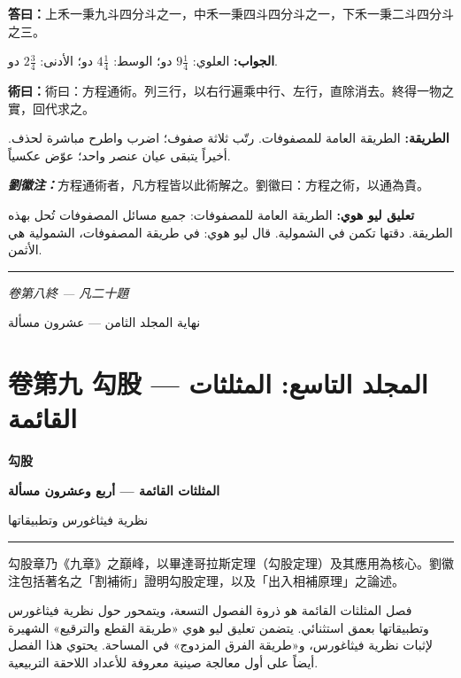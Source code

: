 \documentclass[11pt,a4paper]{article}
\newcommand{\ar}[1]{\arabicfont\beginR #1\endR}
\newcommand{\longline}{\noindent\rule{\textwidth}{0.4pt}}
\newcommand{\ChinCol}[1]{\begin{minipage}[t]{0.48\textwidth}#1\end{minipage}}
\newcommand{\ArabCol}[1]{\begin{minipage}[t]{0.48\textwidth}\arabicfont\beginR #1\endR\end{minipage}}
\newcommand{\parallelsection}[2]{%
  \noindent\ChinCol{#1}\hfill\ArabCol{#2}\par\vspace{0.5cm}%
}
\newcounter{probnum}
\newcommand{\answer}[2]{\par\noindent%
  \begin{minipage}[t]{0.48\textwidth}\textbf{答曰：}#1\end{minipage}%
  \hfill%
  \begin{minipage}[t]{0.48\textwidth}\arabicfont\beginR\textbf{الجواب:} #2\endR\end{minipage}\par\vspace{0.2cm}}
\newcommand{\method}[2]{\par\noindent%
  \begin{minipage}[t]{0.48\textwidth}\textbf{術曰：}#1\end{minipage}%
  \hfill%
  \begin{minipage}[t]{0.48\textwidth}\arabicfont\beginR\textbf{الطريقة:} #2\endR\end{minipage}\par\vspace{0.3cm}}
\newcommand{\commentary}[2]{\par\noindent%
  \begin{minipage}[t]{0.48\textwidth}\textcolor{commentarycolor}{\textit{\textbf{劉徽注：}}#1}\end{minipage}%
  \hfill%
  \begin{minipage}[t]{0.48\textwidth}\arabicfont\beginR\textcolor{commentarycolor}{\textbf{تعليق ليو هوي:} #2}\endR\end{minipage}\par\vspace{0.2cm}}
\begin{document}
\answer{上禾一秉九斗四分斗之一，中禾一秉四斗四分斗之一，下禾一秉二斗四分斗之三。}{العلوي: $9\frac{1}{4}$ دو؛ الوسط: $4\frac{1}{4}$ دو؛ الأدنى: $2\frac{3}{4}$ دو.}

\method{術曰：方程通術。列三行，以右行遍乘中行、左行，直除消去。終得一物之實，回代求之。}{الطريقة العامة للمصفوفات. رتّب ثلاثة صفوف؛ اضرب واطرح مباشرة لحذف. أخيراً يتبقى عيان عنصر واحد؛ عوّض عكسياً.}

\commentary{方程通術者，凡方程皆以此術解之。劉徽曰：方程之術，以通為貴。}{الطريقة العامة للمصفوفات: جميع مسائل المصفوفات تُحل بهذه الطريقة. دقتها تكمن في الشمولية. قال ليو هوي: في طريقة المصفوفات، الشمولية هي الأثمن.}

\vspace{0.5cm}
\longline
\begin{center}
\textit{卷第八終 --- 凡二十題}

\vspace{0.2cm}

{\arabicfont\beginR نهاية المجلد الثامن --- عشرون مسألة\endR}
\end{center}

\newpage

\setcounter{probnum}{0}

\section{卷第九 勾股 --- \ar{المجلد التاسع: المثلثات القائمة}}
\label{sec:vol9}

\begin{center}
{\Large\bfseries\color{volcolor} 勾股}

\vspace{0.2cm}

{\fontsize{14}{18}\selectfont\arabicfont\beginR\color{volcolor}\textbf{المثلثات القائمة --- أربع وعشرون مسألة}\endR}

\vspace{0.2cm}

{\small\color{notecolor}\arabicfont\beginR نظرية فيثاغورس وتطبيقاتها\endR}
\end{center}

\vspace{0.3cm}
\longline
\vspace{0.3cm}

\parallelsection{%
勾股章乃《九章》之巔峰，以畢達哥拉斯定理（勾股定理）及其應用為核心。劉徽注包括著名之「割補術」證明勾股定理，以及「出入相補原理」之論述。
}{%
فصل المثلثات القائمة هو ذروة الفصول التسعة، ويتمحور حول نظرية فيثاغورس وتطبيقاتها بعمق استثنائي. يتضمن تعليق ليو هوي «طريقة القطع والترقيع» الشهيرة لإثبات نظرية فيثاغورس، و«طريقة الفرق المزدوج» في المساحة. يحتوي هذا الفصل أيضاً على أول معالجة صينية معروفة للأعداد اللاحقة التربيعية.
}
\end{document}
